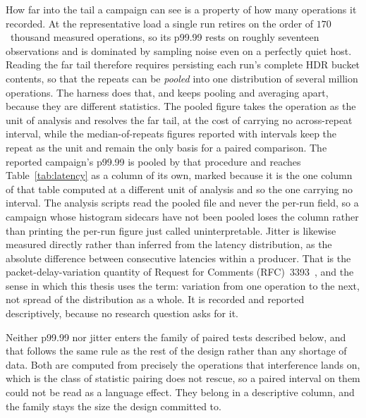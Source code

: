 How far into the tail a campaign can see is a property of how many operations it recorded. At
the representative load a single run retires on the order of $170$~thousand measured
operations, so its p99.99 rests on roughly seventeen observations and is dominated by sampling
noise even on a perfectly quiet host. Reading the far tail therefore requires persisting each
run's complete HDR bucket contents, so that the repeats can be \emph{pooled} into one
distribution of several million operations. The harness does that, and keeps pooling and
averaging apart, because they are different statistics. The pooled figure takes the operation as
the unit of analysis and resolves the far tail, at the cost of carrying no across-repeat
interval, while the median-of-repeats figures reported with intervals keep the repeat as the
unit and remain the only basis for a paired comparison. The reported campaign's p99.99 is pooled
by that procedure and reaches Table~\ref{tab:latency} as a column of its own, marked because it
is the one column of that table computed at a different unit of analysis and so the one carrying
no interval. The analysis scripts read the pooled file and never the per-run field, so a
campaign whose histogram sidecars have not been pooled loses the column rather than printing the
per-run figure just called uninterpretable. Jitter is likewise measured directly rather than
inferred from the latency distribution, as the absolute difference between consecutive latencies
within a producer. That is the packet-delay-variation quantity of Request for Comments
(RFC)~3393~\cite{rfc3393}, and the sense in which this thesis uses the term: variation from one
operation to the next, not spread of the distribution as a whole. It is recorded and reported
descriptively, because no research question asks for it.

Neither p99.99 nor jitter enters the family of paired tests described below, and that follows
the same rule as the rest of the design rather than any shortage of data. Both are computed from
precisely the operations that interference lands on, which is the class of statistic pairing
does not rescue, so a paired interval on them could not be read as a language effect. They
belong in a descriptive column, and the family stays the size the design committed to.

